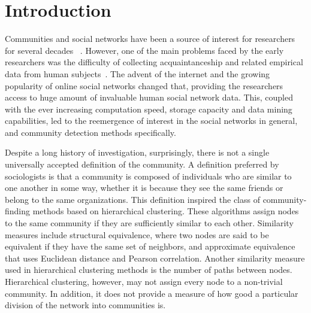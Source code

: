 \documentclass{sig-alternate}
\begin{document}

\section{Introduction} \label{sec:intro}
Communities and social networks have been a source of interest for researchers for several decades ~\cite{Pool,Katz}. However, one of the main problems faced by the early researchers was the difficulty of collecting acquaintanceship and related empirical data from human subjects~\cite{Pool}. The advent of the internet and the growing popularity of online social networks changed that, providing the researchers access  to huge amount of invaluable human social network data. This, coupled  with the  ever increasing computation speed, storage capacity and data mining capabilities, led to the reemergence of interest in the social networks in general, and community detection methods specifically.

Despite a long history of investigation, surprisingly, there is not a single universally accepted definition of the community. A  definition preferred by sociologists is that a community is composed of individuals who are similar to one another in some way, whether it is because they see the same friends or belong to the same organizations. This definition inspired the class of community-finding methods based on hierarchical clustering. These algorithms assign nodes to the same community if they are sufficiently similar to each other. Similarity measures include structural equivalence, where two nodes are said to be equivalent if they have the same set of neighbors, and approximate equivalence that uses Euclidean distance and Pearson correlation. Another similarity measure used in hierarchical clustering methods is the number of paths between nodes. Hierarchical clustering, however, may not assign every node to a non-trivial community. In addition, it does not provide a measure of how good a particular division of the network into communities is.
\end{document}
